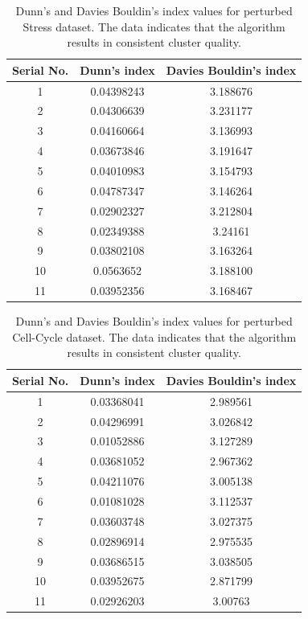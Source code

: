 \begin{table}
\centering
\begin{tabular}{|c|c|c|}
\hline
Serial No. & Dunn's index  & Davies Bouldin's index\\
\hline 
1 & 0.04398243 & 3.188676 \\
2 & 0.04306639 & 3.231177 \\
3 & 	0.04160664 & 3.136993 \\
4 & 	0.03673846 & 3.191647 \\
5 & 	0.04010983 & 3.154793 \\
6 & 	0.04787347 & 3.146264 \\
7 & 	0.02902327 & 3.212804 \\
8 & 	0.02349388 & 3.24161 \\
9 & 	0.03802108 & 3.163264 \\
10 & 	0.0563652 & 3.188100 \\
11 & 	0.03952356 & 3.168467 \\
\hline 
\end{tabular}
\caption{Dunn's and Davies Bouldin's index values for perturbed Stress dataset. The data indicates that the algorithm results in consistent cluster quality.}
\label{tab:stress_only_perturb}
\end{table}

\begin{table}
\centering
\begin{tabular}{|c|c|c|}
\hline
Serial No. & Dunn's index  & Davies Bouldin's index\\
\hline
1 & 0.03368041 & 2.989561 \\
2 & 0.04296991 & 3.026842 \\
3 & 0.01052886 & 3.127289 \\
4 & 0.03681052 & 2.967362 \\
5 & 0.04211076 & 3.005138 \\
6 & 0.01081028 & 3.112537 \\
7 & 0.03603748 & 3.027375 \\
8 & 0.02896914 & 2.975535 \\
9 & 0.03686515 & 3.038505 \\
10 & 0.03952675 & 2.871799 \\
11 & 0.02926203 & 3.00763 \\
\hline 
\end{tabular}
\caption{Dunn's and Davies Bouldin's index values for perturbed Cell-Cycle dataset. The data indicates that the algorithm results in consistent cluster quality.}
\label{tab:cellcycle_only_perturb}
\end{table}

